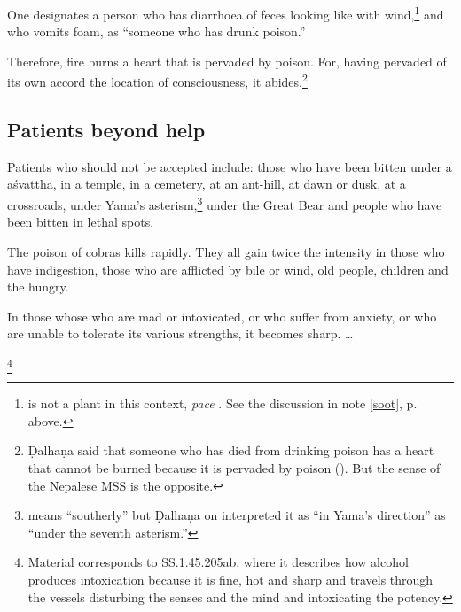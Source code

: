 \begin{translation}[resume]
One designates a person who has diarrhoea of feces looking like
 with wind,\footnote{ is not a plant
    in this context, \emph{pace} \cite[362]{moni-sans}. See the discussion
    in note \ref{soot}, p.\,\pageref{soot} above.\label{grhadhuma}} and who
    vomits foam, as “someone who has drunk poison.” \item[37]  Therefore,
    fire burns a  heart that is  pervaded by poison. For, having pervaded
    of its own accord  the location of consciousness, it
    abides.\footnote{Ḍalhaṇa said that someone who has died from drinking
        poison has a heart that cannot be burned because it is pervaded by
        poison (). But the sense of the Nepalese MSS is the
        opposite.}
 
 \subsection{Patients beyond help}  
 
 \item[38] 

Patients who should not be accepted include: those who have been
bitten under a \gls{aśvattha}, in a temple, in a cemetery, at an
ant-hill, at dawn or dusk, at a crossroads, under Yama's
asterism,\footnote{ means “southerly” but Ḍalhaṇa on
     interpreted it as “in
    Yama's direction” as “under the seventh asterism.”} under the Great
    Bear and people who have been bitten in lethal spots.
 
 \item[39]  
 
The poison of cobras kills rapidly.  They all gain twice the intensity
in those who have indigestion, those who are afflicted by bile or
wind, old people, children and the hungry.
 
 
 \item[39.1]  
 
In those whose who are mad or intoxicated, or who suffer from anxiety,
or who are unable to tolerate its various strengths, it becomes sharp.
\dag \ldots
 
 \item[39.2] 
 
 
 \footnote{Material corresponds to SS.1.45.205ab, where it  
 describes how alcohol produces intoxication because it is fine, hot  
 and sharp and travels through the vessels disturbing the senses and  
 the mind and intoxicating the potency.}  
 

\end{translation}
